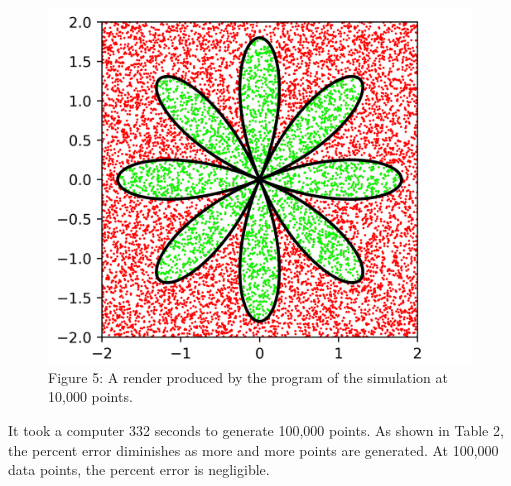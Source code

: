 \documentclass[11pt]{article}
\begin{document}
\begin{figure}[h]
\includegraphics[scale=.2]{monte_carlo_rose}
\centering\\
\footnotesize\centering Figure 5: A render produced by the program of the simulation at 10,000 points.
\end{figure}

It took a computer 332 seconds to generate 100,000 points. As shown in Table 2, the percent error diminishes as more and more points are generated. At 100,000 data points, the percent error is negligible.
\end{document}
